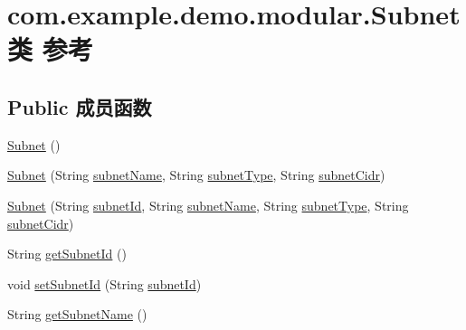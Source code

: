 \hypertarget{classcom_1_1example_1_1demo_1_1modular_1_1_subnet}{}\section{com.\+example.\+demo.\+modular.\+Subnet类 参考}
\label{classcom_1_1example_1_1demo_1_1modular_1_1_subnet}
\subsection*{Public 成员函数}
\begin{DoxyCompactItemize}
\item 
\mbox{\hyperlink{classcom_1_1example_1_1demo_1_1modular_1_1_subnet_a3a708c56d6efdde55c25c8a5a403156b}{Subnet}} ()
\item 
\mbox{\hyperlink{classcom_1_1example_1_1demo_1_1modular_1_1_subnet_ae2e7fde5295d557010315feaecd2b096}{Subnet}} (String \mbox{\hyperlink{classcom_1_1example_1_1demo_1_1modular_1_1_subnet_abe0e0230f1c5bcde3df1a8b73e28124c}{subnet\+Name}}, String \mbox{\hyperlink{classcom_1_1example_1_1demo_1_1modular_1_1_subnet_a00aeb2821c490692871bc758e38236d2}{subnet\+Type}}, String \mbox{\hyperlink{classcom_1_1example_1_1demo_1_1modular_1_1_subnet_a63020f0a21f800ddf324568ce953ee5b}{subnet\+Cidr}})
\item 
\mbox{\hyperlink{classcom_1_1example_1_1demo_1_1modular_1_1_subnet_ac6d8e72c8a7a13cdbdcc57e22e7e073e}{Subnet}} (String \mbox{\hyperlink{classcom_1_1example_1_1demo_1_1modular_1_1_subnet_a00d193dc9c931f8685f1aed499e2e4a7}{subnet\+Id}}, String \mbox{\hyperlink{classcom_1_1example_1_1demo_1_1modular_1_1_subnet_abe0e0230f1c5bcde3df1a8b73e28124c}{subnet\+Name}}, String \mbox{\hyperlink{classcom_1_1example_1_1demo_1_1modular_1_1_subnet_a00aeb2821c490692871bc758e38236d2}{subnet\+Type}}, String \mbox{\hyperlink{classcom_1_1example_1_1demo_1_1modular_1_1_subnet_a63020f0a21f800ddf324568ce953ee5b}{subnet\+Cidr}})
\item 
String \mbox{\hyperlink{classcom_1_1example_1_1demo_1_1modular_1_1_subnet_aa9793c2ef150e0dc258efd1b52e40051}{get\+Subnet\+Id}} ()
\item 
void \mbox{\hyperlink{classcom_1_1example_1_1demo_1_1modular_1_1_subnet_a572ca705a664178f16925a56ec81f92d}{set\+Subnet\+Id}} (String \mbox{\hyperlink{classcom_1_1example_1_1demo_1_1modular_1_1_subnet_a00d193dc9c931f8685f1aed499e2e4a7}{subnet\+Id}})
\item 
String \mbox{\hyperlink{classcom_1_1example_1_1demo_1_1modular_1_1_subnet_a5f8c9ec82eeb70c78d9b54fa9b714a24}{get\+Subnet\+Name}} ()

\end{DoxyCompactItemize}
